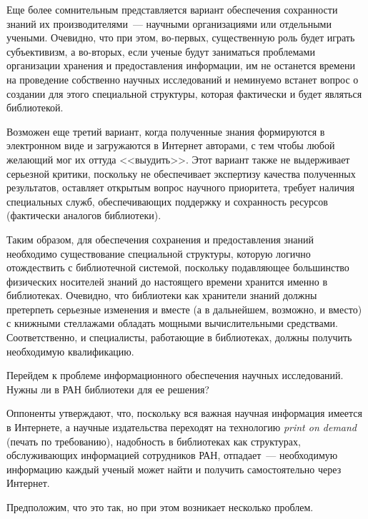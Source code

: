 \begin{multicols}{2}
Еще более сомнительным представляется вариант обеспечения 
сохранности знаний их произ\-водителями~--- научными организациями или отдельными 
учеными. Очевидно, что при этом, во-пер\-вых, существенную роль будет играть 
субъективизм, а во-вто\-рых, если ученые будут заниматься проблемами организации 
хранения и\linebreak
 предоставления информации, им не останется време\-ни на проведение 
собственно научных ис\-следований и неминуемо встанет вопрос о создании для этого 
специальной структуры, которая фактически и будет являться библиотекой. 

Возможен 
еще третий вариант, когда полученные знания формируются в электронном виде и 
загружаются в Интернет авторами, с тем чтобы любой же\-ла\-ющий мог их оттуда 
<<выудить>>. Этот вариант также не выдерживает серьезной критики, поскольку не 
обеспечивает экспертизу качества полученных результатов, оставляет открытым вопрос 
научного приоритета, требует наличия специальных служб, обеспечивающих поддержку и
сохран\-ность ресурсов (фактически аналогов биб\-лио\-теки). 
{

}
   
   Таким образом, для обеспечения сохранения и предоставления знаний необходимо 
существование специальной структуры, которую логично отождествить с библиотечной 
системой, поскольку по\-дав\-ля\-ющее большинство физических носителей знаний до 
настоящего времени хранится именно в библиотеках. Очевидно, что библиотеки как 
хранители знаний должны претерпеть серьезные изменения и вместе (а в дальнейшем, 
возможно, и вместо) с книжными стеллажами обладать мощными 
вычислительными средствами. Соответственно, и специалисты, работающие в 
библиотеках, должны получить необходимую квалификацию. 
   
   Перейдем к проблеме информационного обеспечения научных исследований. Нужны 
ли в РАН библиотеки для ее решения? 
   
   Оппоненты утверждают, что, поскольку вся важная научная информация имеется в 
Интернете, а научные издательства переходят на технологию \textit{print on demand} 
(печать по требованию), надобность в библиотеках как структурах, обслуживающих 
информацией сотрудников РАН, отпадает~--- необходимую информацию каждый ученый 
может найти и получить самостоятельно через Интернет. 
   
   Предположим, что это так, но при этом возникает несколько проблем. 
   

\end{multicols}
